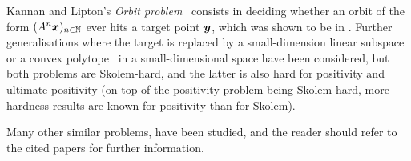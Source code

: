 Kannan and Lipton's \emph{Orbit problem}~\cite{KL86} consists in deciding whether an orbit of the form $(A^{n} \boldsymbol{x})_{n \in \mathbb{N}}$ ever hits a target point $\boldsymbol{y}$, which was shown to be in \PTIME{}. Further generalisations where the target is replaced by a small-dimension linear subspace~\cite{COW13} or a convex polytope~\cite{COW15:SODA} in a small-dimensional space have been considered, but both problems are Skolem-hard, and the latter is also hard for positivity and ultimate positivity (on top of the positivity problem being Skolem-hard, more hardness results are known for positivity than for Skolem).

Many other similar problems, have been studied, and the reader should refer to the cited papers for further information.
